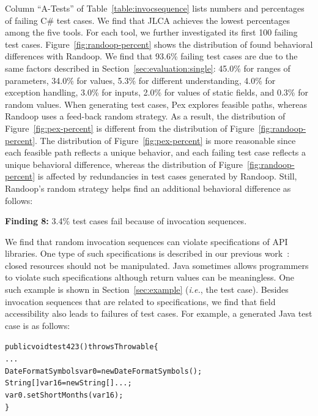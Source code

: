 
Column ``A-Tests'' of Table~\ref{table:invocsequence} lists numbers and percentages of failing C\# test cases. We find that JLCA achieves the lowest percentages among the five tools. For each tool, we further investigated its first 100 failing test cases. Figure~\ref{fig:randoop-percent} shows the distribution of found behavioral differences with Randoop. We find that 93.6\% failing test cases are due to the same factors described in Section~\ref{sec:evaluation:single}: 45.0\% for ranges of parameters, 34.0\% for  values, 5.3\% for different understanding, 4.0\% for exception handling, 3.0\% for  inputs, 2.0\% for values of static fields, and 0.3\% for random values. When generating test cases, Pex explores feasible paths, whereas Randoop uses a feed-back random strategy. As a result, the distribution of Figure~\ref{fig:pex-percent} is different from the distribution of Figure~\ref{fig:randoop-percent}. The distribution of Figure~\ref{fig:pex-percent} is more reasonable since each feasible path reflects a unique behavior, and each failing test case reflects a unique behavioral difference, whereas the distribution of Figure~\ref{fig:randoop-percent} is affected by redundancies in test cases generated by Randoop. Still, Randoop's random strategy helps find an additional behavioral difference as follows:

\textbf{Finding 8:} 3.4\% test cases fail because of invocation sequences.

We find that random invocation sequences can violate specifications of API libraries. One type of such specifications is described in our previous work~\citep{zhong09:inferring}: closed resources should not be manipulated. Java sometimes allows programmers to violate such specifications although return values can be meaningless. One such example is shown in Section~\ref{sec:example} (\emph{i.e.}, the  test case). Besides invocation sequences that are related to specifications, we find that field accessibility also leads to failures of test cases. For example, a generated Java test case is as follows:

\begin{CodeOut}%
\begin{alltt}
public void test423() throws Throwable\{
  ...
  DateFormatSymbols var0 = new DateFormatSymbols();
  String[] var16 = new String[]{...};
  var0.setShortMonths(var16);
\}
\end{alltt}
\end{CodeOut}%

